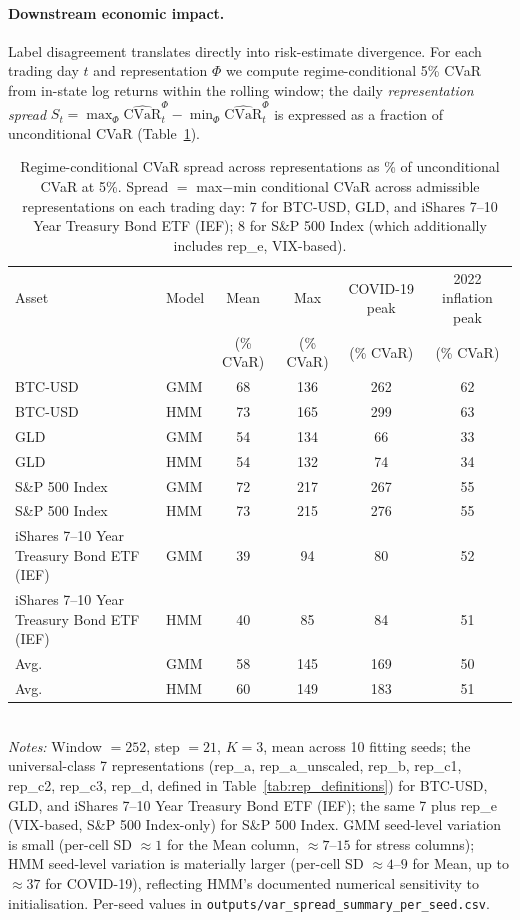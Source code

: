 \documentclass[preprint,12pt,authoryear]{elsarticle}
\newcommand{\SPX}{S\&P 500 Index}
\newcommand{\IEF}{iShares 7--10 Year Treasury Bond ETF (IEF)}
\begin{document}
\paragraph{Downstream economic impact.}
Label disagreement translates directly into risk-estimate divergence. For each trading day $t$ and representation $\Phi$ we compute regime-conditional 5\% CVaR from in-state log returns within the rolling window; the daily \emph{representation spread} $S_t = \max_\Phi \widehat{\mathrm{CVaR}}_t^\Phi - \min_\Phi \widehat{\mathrm{CVaR}}_t^\Phi$ is expressed as a fraction of unconditional CVaR (Table~\ref{tab:cvar_spread}).

\begin{table}[!htbp]
\centering
\small
\setlength{\tabcolsep}{5pt}
\caption{Regime-conditional CVaR spread across representations as \% of unconditional CVaR at 5\%.
Spread $=$ max$-$min conditional CVaR across admissible representations on each trading day: 7 for BTC-USD, GLD, and \IEF{}; 8 for \SPX{} (which additionally includes rep\_e, VIX-based).}
\label{tab:cvar_spread}
\begin{tabular}{llcccc}
\toprule
Asset & Model & Mean & Max & COVID-19 peak & 2022 inflation peak \\
       &        & (\% CVaR) & (\% CVaR) & (\% CVaR) & (\% CVaR) \\
\midrule
BTC-USD & GMM   & 68  & 136 & 262 & 62 \\
BTC-USD & HMM   & 73  & 165 & 299 & 63 \\
GLD     & GMM   & 54  & 134 & 66  & 33 \\
GLD     & HMM   & 54  & 132 & 74  & 34 \\
\SPX{}  & GMM   & 72  & 217 & 267 & 55 \\
\SPX{}  & HMM   & 73  & 215 & 276 & 55 \\
\IEF{}  & GMM   & 39  & 94  & 80  & 52 \\
\IEF{}  & HMM   & 40  & 85  & 84  & 51 \\
\midrule
Avg.    & GMM   & 58  & 145 & 169 & 50 \\
Avg.    & HMM   & 60  & 149 & 183 & 51 \\
\bottomrule
\end{tabular}
\medskip\\
\footnotesize
\textit{Notes:} Window $=252$, step $=21$, $K=3$, mean across 10 fitting seeds; the universal-class 7 representations (rep\_a, rep\_a\_unscaled, rep\_b, rep\_c1, rep\_c2, rep\_c3, rep\_d, defined in Table~\ref{tab:rep_definitions}) for BTC-USD, GLD, and \IEF{}; the same 7 plus rep\_e (VIX-based, \SPX{}-only) for \SPX{}. GMM seed-level variation is small (per-cell SD $\approx 1$ for the Mean column, $\approx 7$--$15$ for stress columns); HMM seed-level variation is materially larger (per-cell SD $\approx 4$--$9$ for Mean, up to $\approx 37$ for COVID-19), reflecting HMM's documented numerical sensitivity to initialisation. Per-seed values in \texttt{outputs/var\_spread\_summary\_per\_seed.csv}.

\end{table}
\end{document}

